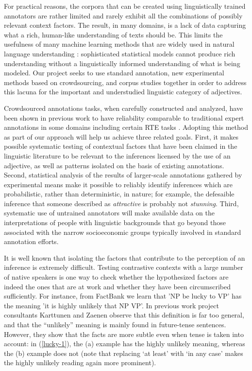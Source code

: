 \documentclass[10pt]{article}
\begin{document}
For practical reasons, the corpora that can be created using linguistically trained annotators are rather limited and rarely exhibit all the combinations of possibly relevant context factors. The result, in many domains, is a lack of data capturing what a rich, human-like understanding of texts should be. This limits the usefulness of many machine learning methods that are widely used in natural language understanding \cite{manning1999foundations,wasserman2004all,murphy2012machine}: sophisticated statistical models cannot produce rich understanding without a linguistically informed understanding of what is being modeled. Our project seeks to use standard annotation, new experimental methods based on crowdsourcing, and corpus studies together in order to address this lacuna for the important and understudied linguistic category of adjectives.

Crowdsourced annotations tasks, when carefully constructed and analyzed, have been shown in previous work to have reliability comparable to traditional expert annotations in some domains including certain RTE tasks \cite{snow:08,munroetal2010}. Adopting this method as part of our approach will help us achieve three related goals. First, it makes possible systematic testing of contextual factors that have been claimed in the linguistic literature to be relevant to the inferences licensed by the use of an adjective, as well as patterns isolated on the basis of existing annotations. Second, statistical analysis of the results of larger-scale annotations gathered by experimental means make it possible to reliably identify inferences which are probabilistic, rather than deterministic, in nature; for example, the defesaible inference that someone described as \emph{attractive} is probably not \emph{stunning}. Third, systematic use of untrained annotators will make available data on the interpretations of people with linguistic backgrounds that go beyond those associated with the narrow socioeconomic groups typically involved in standard annotation efforts. 

It is well known that isolating the factors that contribute to the perception of an inference is extremely difficult. Testing contrastive contexts with a large number of native speakers is one way to check whether the hypothesized factors are indeed the ones that are at work and whether they have been circumscribed sufficiently. For instance, from FactBank we learn that 'NP be lucky to VP' has the meaning 'it is highly unlikely that NP VP'. In previous work project consultants Karttunen and Zaenen \cite{karttunen:2012b,zaenen+karttunen:2013} observe that this definition is far too general, and that the ``unlikely'' meaning is mainly found in future-tense sentences. However, they show that the facts are more subtle even when tense is taken into account: in (\ref{lucky-1}), the (a) example has the highly unlikely meaning, whereas the (b) example does not (note that replacing `at least' with `in any case' makes the highly unlikely reading again more prominent).
 \vspace{-.1in}
\end{document}
